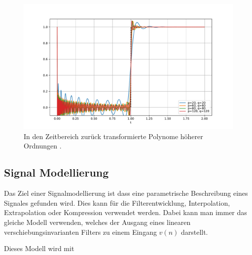 \begin{figure}
	\centering
	\includegraphics[width=1\linewidth]{./papers/pade/python/bilder/padehigh1.pdf}
	\caption{In den Zeitbereich zurück transformierte Polynome höherer Ordnungen \label{pade:totzeit}.}
\end{figure}



\subsection{Signal Modellierung
	\label{pade:subsection:SignalMod}}

Das Ziel einer Signalmodellierung ist dass eine parametrische Beschreibung eines Signales gefunden wird.
Dies kann für die Filterentwicklung, Interpolation, Extrapolation oder Kompression verwendet werden.
Dabei kann man immer das gleiche Modell verwenden, welches der Ausgang eines linearen verschiebungsinvarianten Filters zu einem Eingang $v(n)$ darstellt. 
\begin{figure}
	\centering
	\tikzset{>=latex}
\end{figure}
Dieses Modell wird mit

